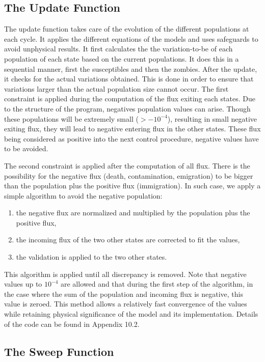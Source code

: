 \documentclass[11pt]{article} %
\begin{document}
\subsection{The Update Function}\indent

The update function takes care of the evolution of the different populations at each cycle. It applies the different equations of the models and uses safeguards to avoid unphysical results. It first calculates the the variation-to-be of each population of each state based on the current populations. It does this in a sequential manner, first the susceptibles and then the zombies. After the update, it checks for the actual variations obtained. This is done in order to ensure that variations larger than the actual population size cannot occur.
The first constraint is applied during the computation of the flux exiting each states. Due to the structure of the program, negatives population values can arise. Though these populations will be extremely small ($> - 10^{-4}$), resulting in small negative exiting flux, they will lead to negative entering flux in the other states. These flux being considered as positive into the next control procedure, negative values have to be avoided.

The second constraint is applied after the computation of all flux. There is the possibility for the negative flux (death, contamination, emigration) to be bigger than the population plus the positive flux (immigration). In such case, we apply a simple algorithm to avoid the negative population:
\begin{enumerate}
	\item the negative flux are normalized and multiplied by the population plus the positive flux,
	\item the incoming flux of the two other states are corrected to fit the values,
	\item the validation is applied to the two other states.
\end{enumerate}
This algorithm is applied until all discrepancy is removed. Note that negative values up to $10^{-4}$ are allowed and that during the first step of the algorithm, in the case where the sum of the population and incoming flux is negative, this value is zeroed. This method allows a relatively fast convergence of the values while retaining physical significance of the model and its implementation. Details of the code can be found in Appendix 10.2.

\subsection{The Sweep Function}\indent
\end{document}
